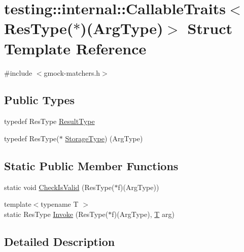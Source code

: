 \hypertarget{structtesting_1_1internal_1_1_callable_traits_3_01_res_type_07_5_08_07_arg_type_08_4}{}\section{testing\+:\+:internal\+:\+:Callable\+Traits$<$ Res\+Type($\ast$)(Arg\+Type)$>$ Struct Template Reference}
\label{structtesting_1_1internal_1_1_callable_traits_3_01_res_type_07_5_08_07_arg_type_08_4}


{\ttfamily \#include $<$gmock-\/matchers.\+h$>$}

\subsection*{Public Types}
\begin{DoxyCompactItemize}
\item 
typedef Res\+Type \hyperlink{structtesting_1_1internal_1_1_callable_traits_3_01_res_type_07_5_08_07_arg_type_08_4_a1959235d286e9c9bb57c1c1139a0cbd8}{Result\+Type}
\item 
typedef Res\+Type($\ast$ \hyperlink{structtesting_1_1internal_1_1_callable_traits_3_01_res_type_07_5_08_07_arg_type_08_4_a0ee48af3b40e5c5bcb48a78cdacf6d9c}{Storage\+Type}) (Arg\+Type)
\end{DoxyCompactItemize}
\subsection*{Static Public Member Functions}
\begin{DoxyCompactItemize}
\item 
static void \hyperlink{structtesting_1_1internal_1_1_callable_traits_3_01_res_type_07_5_08_07_arg_type_08_4_a184f502a16b227a2ec16e49bd23b2ded}{Check\+Is\+Valid} (Res\+Type($\ast$f)(Arg\+Type))
\item 
{\footnotesize template$<$typename T $>$ }\\static Res\+Type \hyperlink{structtesting_1_1internal_1_1_callable_traits_3_01_res_type_07_5_08_07_arg_type_08_4_a8a61fc15cde62a0f06b2ee5a0a805c6c}{Invoke} (Res\+Type($\ast$f)(Arg\+Type), \hyperlink{functions__7_8js_adf1f3edb9115acb0a1e04209b7a9937b}{T} arg)
\end{DoxyCompactItemize}


\subsection{Detailed Description}
